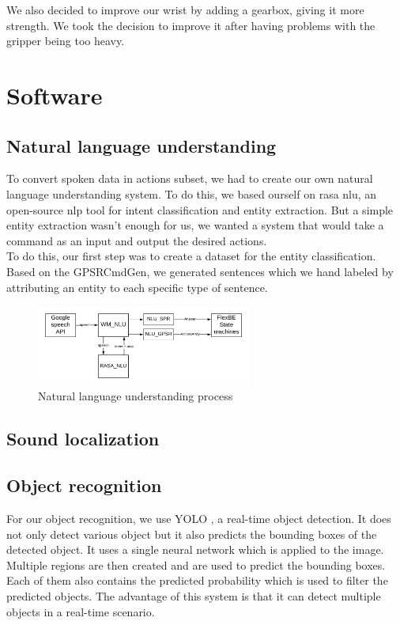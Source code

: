 \documentclass[runningheads,a4paper]{llncs}
\begin{document}
We also decided to improve our wrist by adding a gearbox, giving it more strength. We took the decision to improve it after having problems with the gripper being too heavy.  

\newpage
\section{Software}

\subsection{Natural language understanding}
\tab To convert spoken data in actions subset, we had to create our own natural language understanding system. To do this, we based ourself on rasa nlu\cite{rasa}, an open-source nlp tool for intent classification and entity extraction. But a simple entity extraction wasn't enough for us, we wanted a system that would take a command as an input and output the desired actions.\\

To do this, our first step was to create a dataset for the entity classification. Based on the GPSRCmdGen, we generated sentences which we hand labeled by attributing an entity to each specific type of sentence.      

\begin{figure}
  \centering
  \includegraphics[width=200pt]{images/wm_nlu.png}
  \caption{Natural language understanding process}
\end{figure} 

\subsection{Sound localization}
\tab

\subsection{Object recognition}
\tab For our object recognition, we use YOLO \cite{yolo}, a real-time object detection. It does not only detect various object but it also predicts the bounding boxes of the detected object. It uses a single neural network which is applied to the image. Multiple regions are then created and are used to predict the bounding boxes. Each of them also contains the predicted probability which is used to filter the predicted objects. The advantage of this system is that it can detect multiple objects in a real-time scenario.\\
 
\end{document}
